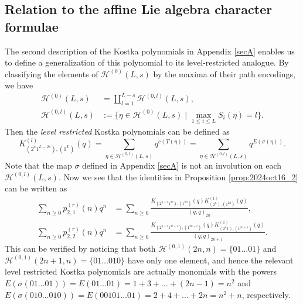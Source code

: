 \documentclass[sn-mathphys-num]{sn-jnl}%
\theoremstyle{thmstyleone}%
\theoremstyle{thmstyletwo}%
\theoremstyle{thmstylethree}%
\begin{document}
\begin{appendices}
\section{Relation to the affine Lie algebra character formulae}\label{secB}
The second description of the Kostka polynomials in Appendix \ref{secA} enables us to define
a generalization of this polynomial to its level-restricted analogue.
By classifying the elements of $\mathcal{H}^{(0)} (L,s)$ by the maxima of their path encodings, 
we have
\begin{align*}
\mathcal{H}^{(0)} (L,s) &= \coprod_{l= 1}^{L-s} \mathcal{H}^{(0,l)} (L,s),\\
\mathcal{H}^{(0,l)} (L,s) &:= \{ \eta \in \mathcal{H}^{(0)} (L,s) \mid
\max_{1 \leq i \leq L} S_i(\eta) = l \}. 
\end{align*}
Then the {\em level restricted} Kostka polynomials can be defined as
\begin{equation*}
K_{(2^s 1^{L-2s}), (1^L)}^{(l)}(q) = \sum_{\eta \in \mathcal{H}^{(0,l)} (L,s)} q^{c(T(\eta))}
=\sum_{\eta \in \mathcal{H}^{(0,l)} (L,s)} q^{E(\sigma(\eta))}. 
\end{equation*}
Note that the map $\sigma$ defined in Appendix \ref{secA} is not an involution on each $\mathcal{H}^{(0,l)} (L,s)$.
Now we see that the identities in Proposition \ref{prop:2024oct16_2}
can be written as
\begin{align}
\sum_{n \geq 0} p^{(r)}_{2,1}(n) q^n
&=  \sum_{n \geq 0} \frac{K_{(2^{n-r} 1^{2r}), (1^{2n})}(q) K_{(2^n), (1^{2n})}^{(1)}(q)}{(q;q)_{2n}}, \label{eq:2025jun20_1} \\
\sum_{n \geq 0} p^{(r)}_{2,2}(n) q^n 
&=  \sum_{n \geq 0} \frac{K_{(2^{n-r} 1^{2r+1}), (1^{2n+1})}(q) K_{(2^n1), (1^{2n+1})}^{(1)}(q)}{(q;q)_{2n+1}}.\label{eq:2025jun20_2}
\end{align}
This can be verified by noticing that both
$\mathcal{H}^{(0,1)} (2n,n) = \{ 01 \dots 01 \}$ and
$\mathcal{H}^{(0,1)} (2n+1,n) = \{ 01 \dots 010 \}$
have only one element, and hence the relevant level restricted Kostka polynomials are actually
monomials with the powers
$E(\sigma(01 \dots 01)) = E(01 \dots 01) = 1+3+\dots + (2n-1) = n^2$ and 
$E(\sigma(010 \dots 010)) = E(00101 \dots 01) = 2+4+\dots + 2n = n^2+n$,
respectively.


\end{appendices}
\end{document}
